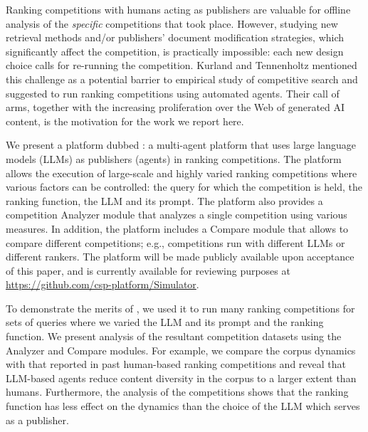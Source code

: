Ranking competitions with humans acting as publishers are valuable for
offline analysis of the {\em specific} competitions that took place. However,
studying new retrieval methods and/or publishers' document
modification strategies, which significantly affect the competition, is
practically impossible: each new design choice calls for re-running the
competition. Kurland and Tennenholtz \cite{kurland_competitive_2022} mentioned this challenge as a potential barrier to empirical study of competitive search and suggested to run ranking competitions using automated agents. Their call of arms, together with the increasing proliferation over the Web of generated AI content, is the motivation for the work we report here.

We present a platform dubbed \platformName: a multi-agent platform
that uses large language models (LLMs) as publishers (agents) in
ranking competitions. The platform allows the execution of large-scale
and highly varied ranking competitions where various factors can
be controlled: the query for which the competition is held, the
ranking function, the LLM and its prompt. The platform also provides a
competition Analyzer module that analyzes a single competition using
various measures. In addition, the platform includes a Compare module that
allows to compare different competitions; e.g., competitions run with different LLMs or different rankers. The \platformName platform will be made publicly
available upon acceptance of this paper, and is currently available
for reviewing purposes at
{\url{https://github.com/csp-platform/Simulator}.}

To demonstrate the merits of \platformName, we used it to run many
ranking competitions for sets of queries where we varied the LLM and
its prompt and the ranking function. We present analysis of the
resultant competition datasets using the Analyzer and Compare modules. For example, we
compare the corpus dynamics with that reported in past human-based
ranking competitions and reveal that LLM-based agents reduce content diversity in the corpus to a larger extent than humans. Furthermore, the analysis of the competitions shows that the ranking function has less effect on the
dynamics than the choice of the LLM which serves as a publisher.
